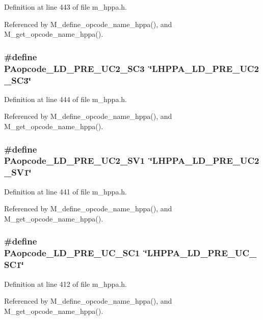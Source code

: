 Definition at line 443 of file m\_\-hppa.h.

Referenced by M\_\-define\_\-opcode\_\-name\_\-hppa(), and M\_\-get\_\-opcode\_\-name\_\-hppa().
\subsubsection{\setlength{\rightskip}{0pt plus 5cm}\#define PAopcode\_\-LD\_\-PRE\_\-UC2\_\-SC3~\char`\"{}LHPPA\_\-LD\_\-PRE\_\-UC2\_\-SC3\char`\"{}}\label{m__hppa_8h_79aced4c0b8e414c8c2d0c0548a1b61b}




Definition at line 444 of file m\_\-hppa.h.

Referenced by M\_\-define\_\-opcode\_\-name\_\-hppa(), and M\_\-get\_\-opcode\_\-name\_\-hppa().
\subsubsection{\setlength{\rightskip}{0pt plus 5cm}\#define PAopcode\_\-LD\_\-PRE\_\-UC2\_\-SV1~\char`\"{}LHPPA\_\-LD\_\-PRE\_\-UC2\_\-SV1\char`\"{}}\label{m__hppa_8h_c1da1eb900505f964fa4f66da7a8f223}




Definition at line 441 of file m\_\-hppa.h.

Referenced by M\_\-define\_\-opcode\_\-name\_\-hppa(), and M\_\-get\_\-opcode\_\-name\_\-hppa().
\subsubsection{\setlength{\rightskip}{0pt plus 5cm}\#define PAopcode\_\-LD\_\-PRE\_\-UC\_\-SC1~\char`\"{}LHPPA\_\-LD\_\-PRE\_\-UC\_\-SC1\char`\"{}}\label{m__hppa_8h_aadb5f9fad406a3d450b4542221e4861}




Definition at line 412 of file m\_\-hppa.h.

Referenced by M\_\-define\_\-opcode\_\-name\_\-hppa(), and M\_\-get\_\-opcode\_\-name\_\-hppa().
